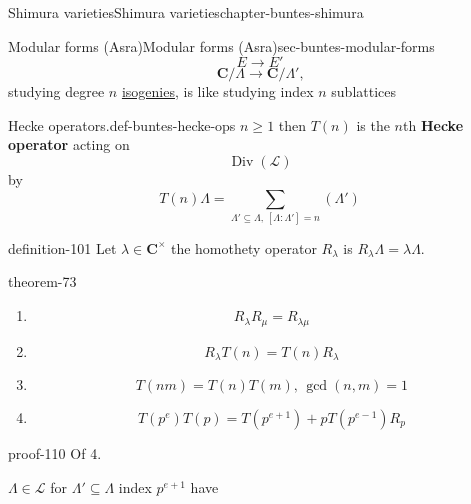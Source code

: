 \documentclass[oneside,10pt,]{book}
\newcommand{\terminology}[1]{\textbf{#1}}
\numberwithin{equation}{section}
\newcommand{\CC}{\mathbf{C}}
\DeclareMathOperator{\divisors}{Div}
\begin{document}
\begin{chapterptx}{Shimura varieties}{}{Shimura varieties}{}{}{chapter-buntes-shimura}
\begin{sectionptx}{Modular forms (Asra)}{}{Modular forms (Asra)}{}{}{sec-buntes-modular-forms}
\begin{equation*}
E \to E'
\end{equation*}
%
\begin{equation*}
\CC/\Lambda \to \CC/\Lambda'\text{,}
\end{equation*}
studying degree \(n\) \hyperref[def-supersing-isog-isog]{isogenies}, is like studying index  \(n \) sublattices%
\begin{definition}{Hecke operators.}{def-buntes-hecke-ops}%
\hypertarget{p-1072}{}%
\(n \ge 1\) then \(T(n)\) is the  \(n\)th \terminology{Hecke operator} acting on%
\begin{equation*}
\divisors (\mathcal L)
\end{equation*}
by%
\begin{equation*}
T(n) \Lambda = \sum_{\Lambda' \subseteq \Lambda,\,[\Lambda : \Lambda'] = n} (\Lambda')
\end{equation*}
%
\end{definition}
\begin{definition}{}{definition-101}%
\hypertarget{p-1073}{}%
Let \(\lambda \in \CC^\times\) the homothety operator \(R_\lambda\) is \(R_\lambda \Lambda = \lambda\Lambda\).%
\end{definition}
\begin{theorem}{}{}{theorem-73}%
\hypertarget{p-1074}{}%
\leavevmode%
\begin{enumerate}
\item\hypertarget{li-271}{}%
\begin{equation*}
R_\lambda R_\mu = R_{\lambda\mu}
\end{equation*}
%
\item\hypertarget{li-272}{}%
\begin{equation*}
R_\lambda T(n) = T(n) R_{\lambda}
\end{equation*}
%
\item\hypertarget{li-273}{}%
\begin{equation*}
T(nm) = T(n) T(m),\,\gcd(n,m) =1
\end{equation*}
%
\item\hypertarget{li-274}{}%
\begin{equation*}
T(p^e)T(p) = T(p^{e+1 }) + p T(p^{e-1}) R_p
\end{equation*}
%
\end{enumerate}
%
\end{theorem}
\begin{proofptx}{}{proof-110}
\hypertarget{p-1075}{}%
Of 4.%
\par
\hypertarget{p-1076}{}%
\(\Lambda \in \mathcal L\) for \(\Lambda' \subseteq \Lambda \) index \(p^{e+1}\) have%

\end{proofptx}
\end{sectionptx}
\end{chapterptx}
\end{document}
